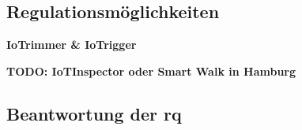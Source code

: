 \subsection{Regulationsmöglichkeiten}
\label{sec:Hauptteil:ssec:Regulationsmöglichkeiten}



\noindent \textbf{IoTrimmer \& IoTrigger} %


\noindent \textbf{TODO: IoTInspector oder Smart Walk in Hamburg} %

\subsection{Beantwortung der \ac{rq}}
\label{sec:Hauptteil:ssec:Beantwortung der wissenschaftlichen Fragen}

